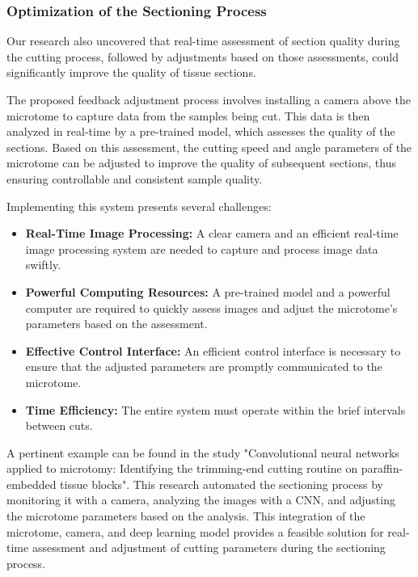 \subsubsection{Optimization of the Sectioning Process}

Our research also uncovered that real-time assessment of section quality during the cutting process, followed by adjustments based on those assessments, could significantly improve the quality of tissue sections.

The proposed feedback adjustment process involves installing a camera above the microtome to capture data from the samples being cut. This data is then analyzed in real-time by a pre-trained model, which assesses the quality of the sections. Based on this assessment, the cutting speed and angle parameters of the microtome can be adjusted to improve the quality of subsequent sections, thus ensuring controllable and consistent sample quality.

Implementing this system presents several challenges:

\begin{itemize}
    \item \textbf{Real-Time Image Processing:} A clear camera and an efficient real-time image processing system are needed to capture and process image data swiftly.
    \item \textbf{Powerful Computing Resources:} A pre-trained model and a powerful computer are required to quickly assess images and adjust the microtome's parameters based on the assessment.
    \item \textbf{Effective Control Interface:} An efficient control interface is necessary to ensure that the adjusted parameters are promptly communicated to the microtome.
    \item \textbf{Time Efficiency:} The entire system must operate within the brief intervals between cuts.
\end{itemize}

A pertinent example can be found in the study "Convolutional neural networks applied to microtomy: Identifying the trimming-end cutting routine on paraffin-embedded tissue blocks"\cite{6.4}. This research automated the sectioning process by monitoring it with a camera, analyzing the images with a CNN, and adjusting the microtome parameters based on the analysis. This integration of the microtome, camera, and deep learning model provides a feasible solution for real-time assessment and adjustment of cutting parameters during the sectioning process.


